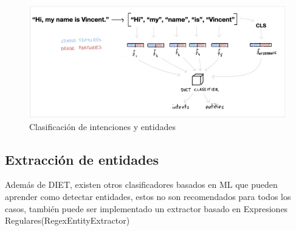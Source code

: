\begin{figure}[h]
    \centering
    \includegraphics[width=\textwidth]{imagenes/cap3/intent_classiffier.png}   
    \caption{Clasificación de intenciones y entidades}
    \label{fig:intentclasification-MLU}
\end{figure}



\subsection{Extracción de entidades}

Además de DIET, existen otros clasificadores basados en ML que pueden aprender como detectar entidades, estos no son recomendados para todos los casos, también puede ser implementado un extractor basado en Expresiones
Regulares(RegexEntityExtractor) \cite{warmerdam_2022}

